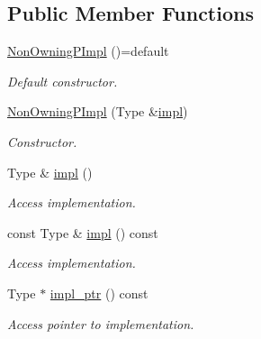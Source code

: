 \subsection*{Public Member Functions}
\begin{DoxyCompactItemize}
\item 
\hypertarget{classSpacy_1_1Mixin_1_1NonOwningPImpl_a56983a18183bc646278b6a41272b6462}{}\hyperlink{classSpacy_1_1Mixin_1_1NonOwningPImpl_a56983a18183bc646278b6a41272b6462}{Non\+Owning\+P\+Impl} ()=default\label{classSpacy_1_1Mixin_1_1NonOwningPImpl_a56983a18183bc646278b6a41272b6462}

\begin{DoxyCompactList}\small\item\em Default constructor. \end{DoxyCompactList}\item 
\hyperlink{classSpacy_1_1Mixin_1_1NonOwningPImpl_ac89a1f4159d143ee2b32c183758d047f_ac89a1f4159d143ee2b32c183758d047f}{Non\+Owning\+P\+Impl} (Type \&\hyperlink{classSpacy_1_1Mixin_1_1NonOwningPImpl_aeeb3e0a5f6fd8f22633040dcf94355f9}{impl})
\begin{DoxyCompactList}\small\item\em Constructor. \end{DoxyCompactList}\item 
\hypertarget{classSpacy_1_1Mixin_1_1NonOwningPImpl_aeeb3e0a5f6fd8f22633040dcf94355f9}{}Type \& \hyperlink{classSpacy_1_1Mixin_1_1NonOwningPImpl_aeeb3e0a5f6fd8f22633040dcf94355f9}{impl} ()\label{classSpacy_1_1Mixin_1_1NonOwningPImpl_aeeb3e0a5f6fd8f22633040dcf94355f9}

\begin{DoxyCompactList}\small\item\em Access implementation. \end{DoxyCompactList}\item 
\hypertarget{classSpacy_1_1Mixin_1_1NonOwningPImpl_a00dac830753831691a254f2dd2799993}{}const Type \& \hyperlink{classSpacy_1_1Mixin_1_1NonOwningPImpl_a00dac830753831691a254f2dd2799993}{impl} () const \label{classSpacy_1_1Mixin_1_1NonOwningPImpl_a00dac830753831691a254f2dd2799993}

\begin{DoxyCompactList}\small\item\em Access implementation. \end{DoxyCompactList}\item 
\hypertarget{classSpacy_1_1Mixin_1_1NonOwningPImpl_ae6764bef8cbc5d794725c0e1316acc96}{}Type $\ast$ \hyperlink{classSpacy_1_1Mixin_1_1NonOwningPImpl_ae6764bef8cbc5d794725c0e1316acc96}{impl\+\_\+ptr} () const \label{classSpacy_1_1Mixin_1_1NonOwningPImpl_ae6764bef8cbc5d794725c0e1316acc96}

\begin{DoxyCompactList}\small\item\em Access pointer to implementation. \end{DoxyCompactList}\end{DoxyCompactItemize}


